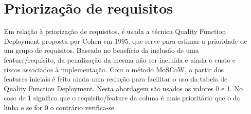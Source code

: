 \documentclass{scrreprt}
\begin{document}

\chapter{Priorização de requisitos}

Em relação à priorização de requisitos, é usada a técnica Quality Function Deployment proposta por Cohen em 1995, que serve para estimar a prioridade de um grupo de requisitos. Baseado no benefício da inclusão de uma feature/requisito, da penalização da mesma não ser incluída e ainda o custo e riscos associados à implementação. Com o método MoSCoW, a partir dos features iniciais é feita ainda uma redução para facilitar o uso da tabela de Quality Function Deployment.
\newline
Nesta abordagem são usados os valores 0 e 1. No caso de 1 significa que o requisito/feature da coluna é mais prioritário que o da linha e se for 0 o contrário verifica-se.
\end{document}
